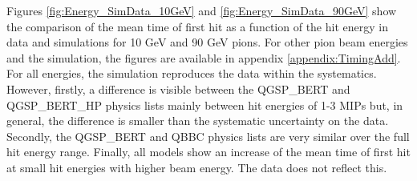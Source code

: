 Figures \ref{fig:Energy_SimData_10GeV} and \ref{fig:Energy_SimData_90GeV} show the comparison of the mean time of first hit as a function of the hit energy in data and simulations for 10 GeV and 90 GeV pions. For other pion beam energies and the \ddhep simulation, the figures are available in appendix \ref{appendix:TimingAdd}. For all energies, the simulation reproduces the data within the systematics. However, firstly, a difference is visible between the QGSP\_BERT and QGSP\_BERT\_HP physics lists mainly between hit energies of 1-3 MIPs but, in general, the difference is smaller than the systematic uncertainty on the data. Secondly, the QGSP\_BERT and QBBC physics lists are very similar over the full hit energy range. Finally, all models show an increase of the mean time of first hit at small hit energies with higher beam energy. The data does not reflect this.

